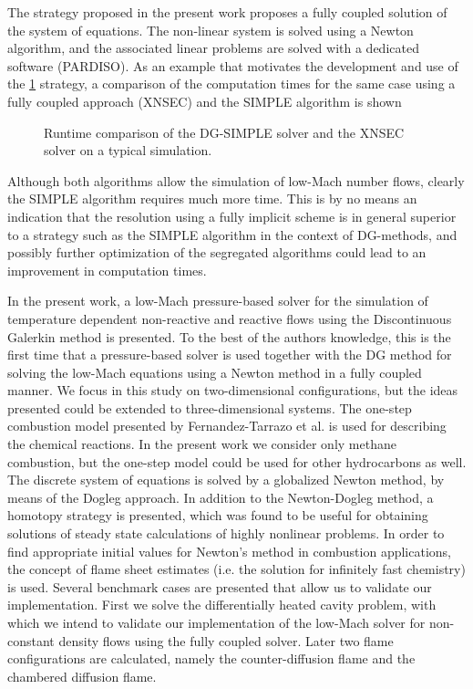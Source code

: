 The strategy proposed in the present work proposes a fully coupled solution of the system of equations. The non-linear system is solved using a Newton algorithm, and the associated linear problems are solved with a dedicated software (PARDISO). As an example that motivates the development and use of the \cref{fig:RuntimeComparisonk2} strategy, a comparison of the computation times for the same case using a fully coupled approach (XNSEC) and the SIMPLE algorithm is shown 

\begin{figure}[h]	
	\centering
	\caption{Runtime comparison of the DG-SIMPLE solver and the XNSEC solver on a typical simulation.}
	\label{fig:RuntimeComparisonk2}
\end{figure}
Although both algorithms allow the simulation of low-Mach number flows, clearly the SIMPLE algorithm requires much more time. This is by no means an indication that the resolution using a fully implicit scheme is in general superior to a strategy such as the SIMPLE algorithm in the context of DG-methods, and possibly further optimization of the segregated algorithms could lead to an improvement in computation times.


In the present work, a low-Mach pressure-based solver for the simulation of temperature dependent non-reactive and reactive flows using the Discontinuous Galerkin method is presented. To the best of the authors knowledge, this is the first time that a pressure-based solver is used together with the DG method for solving the low-Mach equations using a Newton method in a fully coupled manner. We focus in this study on two-dimensional configurations, but the ideas presented could be extended to three-dimensional systems. The one-step combustion model presented by Fernandez-Tarrazo et al. \textcite{fernandez-tarrazoSimpleOnestepChemistry2006} is used for describing the chemical reactions. In the present work we consider only methane combustion, but the one-step model could be used for other hydrocarbons as well. The discrete system of equations is solved by a globalized Newton method, by means of the Dogleg approach. In addition to the Newton-Dogleg method, a homotopy strategy is presented, which was found to be useful for obtaining solutions of steady state calculations of highly nonlinear problems. In order to find appropriate initial values for Newton's method in combustion applications, the concept of flame sheet estimates (i.e. the solution for infinitely fast chemistry) is used. Several benchmark cases are presented that allow us to validate our implementation. First we solve the differentially heated cavity problem, with which we intend to validate our implementation of the low-Mach solver for non-constant density flows using the fully coupled solver. Later two flame configurations are calculated, namely the counter-diffusion flame and the chambered diffusion flame. \parencite{matalonDiffusionFlamesChamber1980}

